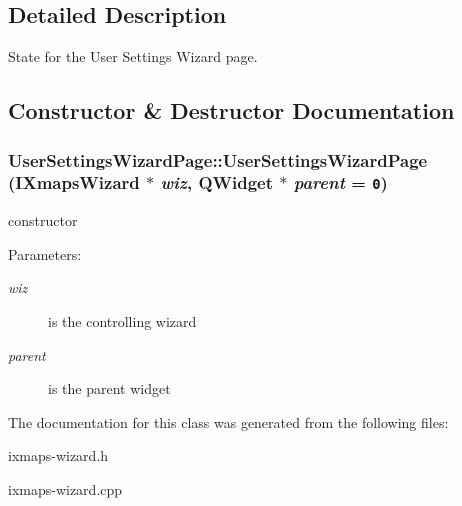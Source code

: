 \subsection{Detailed Description}
State for the User Settings Wizard page. 

\subsection{Constructor \& Destructor Documentation}
\hypertarget{classUserSettingsWizardPage_9eac3682eabd518712190d0fafada08b}{
\subsubsection[UserSettingsWizardPage]{\setlength{\rightskip}{0pt plus 5cm}UserSettingsWizardPage::UserSettingsWizardPage ({\bf IXmapsWizard} $\ast$ {\em wiz}, \/  QWidget $\ast$ {\em parent} = {\tt 0})}}
\label{classUserSettingsWizardPage_9eac3682eabd518712190d0fafada08b}


constructor \begin{Desc}
\item[Parameters:]
\begin{description}
\item[{\em wiz}]is the controlling wizard \item[{\em parent}]is the parent widget \end{description}
\end{Desc}


The documentation for this class was generated from the following files:\begin{CompactItemize}
\item 
ixmaps-wizard.h\item 
ixmaps-wizard.cpp\end{CompactItemize}
